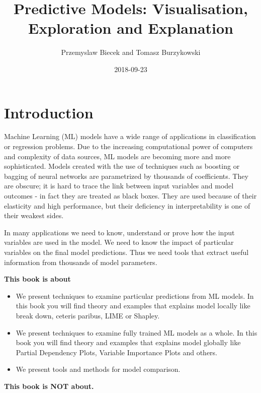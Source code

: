 \documentclass[]{book}
\title{Predictive Models: Visualisation, Exploration and Explanation}
\author{Przemyslaw Biecek and Tomasz Burzykowski}
\date{2018-09-23}
\providecommand{\tightlist}{%
  \setlength{\itemsep}{0pt}\setlength{\parskip}{0pt}}
\theoremstyle{definition}
\theoremstyle{definition}
\theoremstyle{definition}
\theoremstyle{remark}
\begin{document}
\maketitle

{
\setcounter{tocdepth}{1}
\tableofcontents
}
\hypertarget{introduction}{%
\chapter{Introduction}\label{introduction}}

Machine Learning (ML) models have a wide range of applications in
classification or regression problems. Due to the increasing
computational power of computers and complexity of data sources, ML
models are becoming more and more sophisticated. Models created with the
use of techniques such as boosting or bagging of neural networks are
parametrized by thousands of coefficients. They are obscure; it is hard
to trace the link between input variables and model outcomes - in fact
they are treated as black boxes. They are used because of their
elasticity and high performance, but their deficiency in
interpretability is one of their weakest sides.

In many applications we need to know, understand or prove how the input
variables are used in the model. We need to know the impact of
particular variables on the final model predictions. Thus we need tools
that extract useful information from thousands of model parameters.

\textbf{This book is about}

\begin{itemize}
\tightlist
\item
  We present techniques to examine particular predictions from ML
  models. In this book you will find theory and examples that explains
  model locally like break down, ceteris paribus, LIME or Shapley.
\item
  We present techniques to examine fully trained ML models as a whole.
  In this book you will find theory and examples that explains model
  globally like Partial Dependency Plots, Variable Importance Plots and
  others.
\item
  We present tools and methods for model comparison.
\end{itemize}

\textbf{This book is NOT about.}
\end{document}
